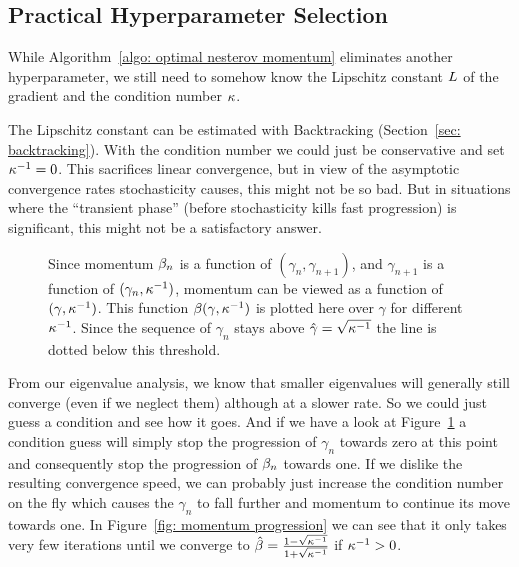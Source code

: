 \subsection{Practical Hyperparameter Selection}

While Algorithm~\ref{algo: optimal nesterov momentum} eliminates another
hyperparameter, we still need to somehow know the Lipschitz constant \(L\)
of the gradient and the condition number \(\kappa\).

The Lipschitz constant can be estimated with Backtracking (Section~\ref{sec:
backtracking}). With the condition number we could just be conservative and set
\(\kappa^{-1}=0\). This sacrifices linear convergence, but in view of the
asymptotic convergence rates stochasticity causes, this might not be so bad. But
in situations where the ``transient phase'' (before stochasticity kills fast
progression) is significant, this might not be a satisfactory answer.

\begin{figure}[h]
	\centering
	\def\svgwidth{1\textwidth}
	
	\caption{
		Since momentum \(\beta_n\) is a function of \((\gamma_n,
		\gamma_{n+1})\), and \(\gamma_{n+1}\) is a function of
		\((\gamma_n,\kappa^{-1})\), momentum can be viewed as a function of
		\((\gamma, \kappa^{-1})\). This function
		\(\beta(\gamma,\kappa^{-1})\) is plotted here over \(\gamma\) for
		different \(\kappa^{-1}\). Since the sequence of \(\gamma_n\) stays
		above \(\hat{\gamma}=\sqrt{\kappa^{-1}}\) the line is dotted below
		this threshold.
	}
	\label{fig: momentum gamma plot}
\end{figure}

From our eigenvalue analysis, we know that smaller eigenvalues will generally
still converge (even if we neglect them) although at a slower rate. So we
could just guess a condition and see how it goes. And if we have a look at
Figure~\ref{fig: momentum gamma plot} a condition guess will simply stop the
progression of \(\gamma_n\) towards zero at this point and consequently stop the
progression of \(\beta_n\) towards one. If we dislike the resulting
convergence speed, we can probably just increase the condition number on the
fly which causes the
\(\gamma_n\) to fall further and momentum to continue its move towards one.
In Figure~\ref{fig: momentum progression} we can see that it only takes very
few iterations until we converge to
\(\hat{\beta}=\frac{1-\sqrt{\kappa^{-1}}}{1+\sqrt{\kappa^{-1}}}\)
if \(\kappa^{-1}>0\).

